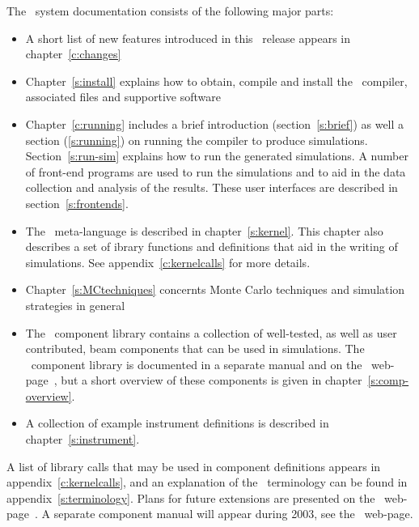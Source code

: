 The \MCS\ system documentation consists of the following major
parts:
\begin{itemize}
\item A short list of new features introduced in this \MCS\ release
  appears in chapter~\ref{c:changes}
\item Chapter~\ref{s:install} explains how to obtain, compile
  and install the \MCS\ compiler, associated files and supportive software
\item Chapter~\ref{c:running} includes a brief introduction
  (section~\ref{s:brief}) as well a section (\ref{s:running}) on running the compiler to produce
  simulations. Section~\ref{s:run-sim} explains how to run the generated
  simulations. A number of front-end programs are used to run the
  simulations and to aid in the data collection and analysis of the
  results. These user interfaces are described in section~\ref{s:frontends}.
\item The \MCS\ meta-language is described in chapter~\ref{s:kernel}. This
  chapter also describes a set of ibrary functions and definitions
  that aid in the writing of simulations. See
  appendix~\ref{c:kernelcalls} for more details.
\item Chapter~\ref{s:MCtechniques} concernts Monte Carlo techniques
  and simulation strategies in general
\item The \MCS\ component library contains a collection of
  well-tested, as well as user contributed, beam components that can be used in simulations.
  The \MCS\ component library is documented in a separate manual
  and on the \MCS\ web-page~\cite{mcstas_webpage}, but a short overview of these
  components is given in chapter~\ref{s:comp-overview}.
\item A collection of example instrument definitions is described in
  chapter~\ref{s:instrument}.%

\end{itemize}

A list of library calls that may be used in component definitions 
appears in appendix~\ref{c:kernelcalls}, and
an explanation of the \MCS\ terminology can be
found in appendix~\ref{s:terminology}.
Plans for future extensions are presented on the \MCS\ web-page~\cite{mcstas_webpage}.
A separate component manual will appear during 2003, see the \MCS\ web-page.


